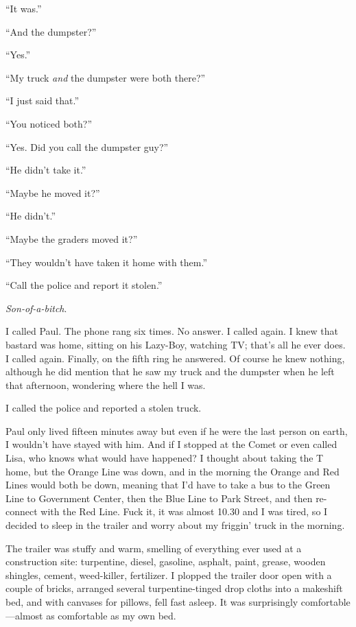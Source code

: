 ``It was.''

``And the dumpster?''

``Yes.''

``My truck \emph{and} the dumpster were both there?''

``I just said that.''

``You noticed both?''

``Yes. Did you call the dumpster guy?''

``He didn't take it.''

``Maybe he moved it?''

``He didn't.''

``Maybe the graders moved it?''

``They wouldn't have taken it home with them.''

``Call the police and report it stolen.''

\emph{Son-of-a-bitch}.

I called Paul. The phone rang six times. No answer. I called again. I
knew that bastard was home, sitting on his Lazy-Boy, watching TV; that's
all he ever does. I called again. Finally, on the fifth ring he
answered. Of course he knew nothing, although he did mention that he saw
my truck and the dumpster when he left that afternoon, wondering where
the hell I was.

I called the police and reported a stolen truck.

Paul only lived fifteen minutes away but even if he were the last person
on earth, I wouldn't have stayed with him. And if I stopped at the Comet
or even called Lisa, who knows what would have happened? I thought about
taking the T home, but the Orange Line was down, and in the morning the
Orange and Red Lines would both be down, meaning that I'd have to take a
bus to the Green Line to Government Center, then the Blue Line to Park
Street, and then re-connect with the Red Line. Fuck it, it was almost
10.30 and I was tired, so I decided to sleep in the trailer and worry
about my friggin' truck in the morning.

The trailer was stuffy and warm, smelling of everything ever used at a
construction site: turpentine, diesel, gasoline, asphalt, paint, grease,
wooden shingles, cement, weed-killer, fertilizer. I plopped the trailer
door open with a couple of bricks, arranged several turpentine-tinged
drop cloths into a makeshift bed, and with canvases for pillows, fell
fast asleep. It was surprisingly comfortable---almost as comfortable as
my own bed.\\


